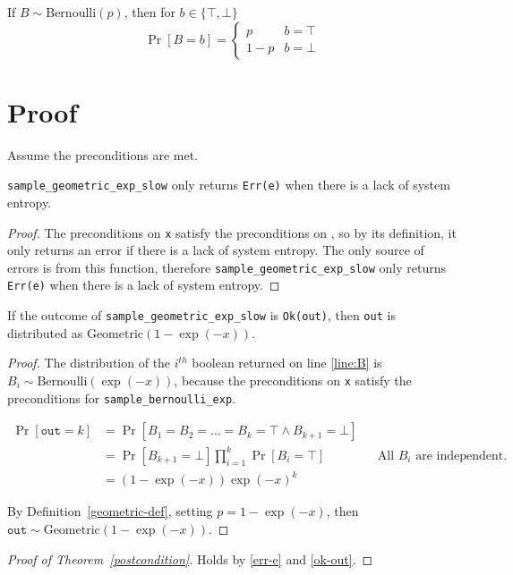 \documentclass{article}
\begin{document}
\begin{definition}
    If $B \sim \mathrm{Bernoulli}(p)$, then for $b \in \{\top, \bot\}$
    \begin{equation}
        \Pr[B = b] = 
        \begin{cases} 
            p & b = \top \\
            1 - p & b = \bot
        \end{cases}
    \end{equation}
\end{definition}
 
\section{Proof} 
Assume the preconditions are met. 
 
\begin{lemma}\label{err-e} 
    \texttt{sample\_geometric\_exp\_slow} only returns \texttt{Err(e)} when there is a lack of system entropy. 
\end{lemma} 
 
\begin{proof} 
    The preconditions on \texttt{x} satisfy the preconditions on , 
    so by its definition, it only returns an error if there is a lack of system entropy. 
    The only source of errors is from this function, 
    therefore \texttt{sample\_geometric\_exp\_slow} only returns \texttt{Err(e)} when there is a lack of system entropy. 
\end{proof} 
 
\begin{theorem} \label{ok-out} \cite{CKS20} 
    If the outcome of \texttt{sample\_geometric\_exp\_slow} is \texttt{Ok(out)},  
    then \texttt{out} is distributed as $\mathrm{Geometric}(1 - \exp(-x))$.
\end{theorem} 
 
\begin{proof} 
    The distribution of the $i^{th}$ boolean returned on line \ref{line:B} is $B_i \sim \mathrm{Bernoulli}(\exp(-x))$, 
    because the preconditions on \texttt{x} satisfy the preconditions for \texttt{sample\_bernoulli\_exp}. 
     
    \begin{align*} 
        \Pr[\texttt{out} = k] &= \Pr[B_1 = B_2 = ... = B_k = \top \land B_{k + 1} = \bot] \\ 
        &= \Pr[B_{k + 1} = \bot] \prod_{i=1}^{k} \Pr[B_i = \top] && \text{All $B_i$ are independent.} \\ 
        &= (1 - \exp(-x)) \exp(-x)^{k}
    \end{align*} 

    By Definition~\ref{geometric-def}, setting $p = 1 - \exp(-x)$, then $\texttt{out} \sim \mathrm{Geometric}(1 - \exp(-x))$.
\end{proof} 
 
\begin{proof}[Proof of Theorem~\ref{postcondition}]
    Holds by \ref{err-e} and \ref{ok-out}. 
\end{proof} 
 
 
 
 
\end{document}
